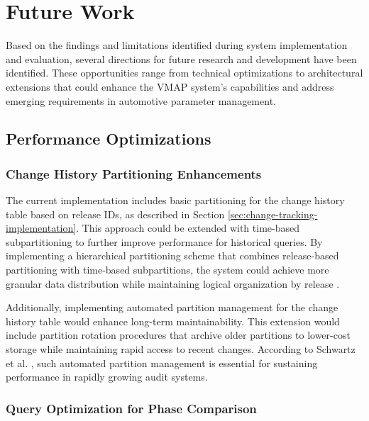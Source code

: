 \section{Future Work}
\label{sec:future-work}

Based on the findings and limitations identified during system implementation and evaluation, several directions for future research and development have been identified. These opportunities range from technical optimizations to architectural extensions that could enhance the \ac{VMAP} system's capabilities and address emerging requirements in automotive parameter management.

\subsection{Performance Optimizations}
\label{subsec:performance-optimizations}

\subsubsection{Change History Partitioning Enhancements}
\label{subsubsec:change-history-partitioning}

The current implementation includes basic partitioning for the change history table based on release IDs, as described in Section \ref{sec:change-tracking-implementation}. This approach could be extended with time-based subpartitioning to further improve performance for historical queries. By implementing a hierarchical partitioning scheme that combines release-based partitioning with time-based subpartitions, the system could achieve more granular data distribution while maintaining logical organization by release \cite{obe2017postgresql}.

Additionally, implementing automated partition management for the change history table would enhance long-term maintainability. This extension would include partition rotation procedures that archive older partitions to lower-cost storage while maintaining rapid access to recent changes. According to Schwartz et al. \cite{schwartz2012high}, such automated partition management is essential for sustaining performance in rapidly growing audit systems.

\subsubsection{Query Optimization for Phase Comparison}
\label{subsubsec:query-optimization}

